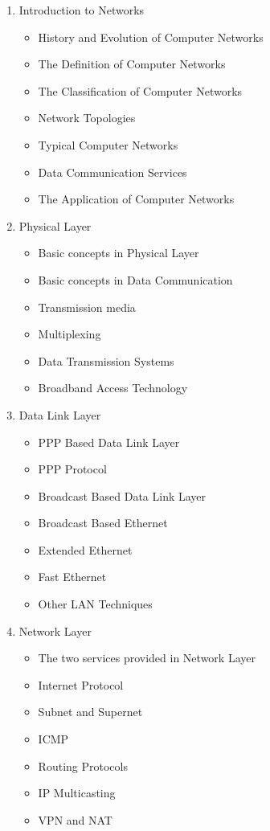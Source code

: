 \documentclass{wx672article}
\begin{document}
\begin{enumerate}
\item Introduction to Networks
\begin{itemize}
\item History and Evolution of Computer Networks
\item The Definition of Computer Networks
\item The Classification of Computer Networks
\item Network Topologies
\item Typical Computer Networks
\item Data Communication Services
\item The Application of Computer Networks
\end{itemize}
\item Physical Layer
\begin{itemize}
\item Basic concepts in Physical Layer
\item Basic concepts in Data Communication
\item Transmission media
\item Multiplexing
\item Data Transmission Systems
\item Broadband Access Technology
\end{itemize}
\item Data Link Layer
\begin{itemize}
\item PPP Based Data Link Layer
\item PPP Protocol
\item Broadcast Based Data Link Layer
\item Broadcast Based Ethernet
\item Extended Ethernet
\item Fast Ethernet
\item Other LAN Techniques
\end{itemize}
\item Network Layer
\begin{itemize}
\item The two services provided in Network Layer
\item Internet Protocol
\item Subnet and Supernet
\item ICMP
\item Routing Protocols
\item IP Multicasting
\item VPN and NAT

\end{itemize}
\end{enumerate}
\end{document}
